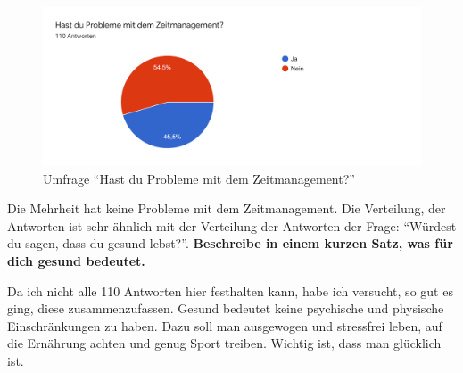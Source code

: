 \begin{figure}[H]
  \centering
  \includegraphics[width=0.7\linewidth]{./images/umfrage_g.png}
  \caption{Umfrage “Hast du Probleme mit dem Zeitmanagement?”}
  \label{fig:umfrage_g}
\end{figure}
Die Mehrheit hat keine Probleme mit dem Zeitmanagement. Die Verteilung, der Antworten ist sehr ähnlich mit der Verteilung der Antworten der Frage: “Würdest du sagen, dass du gesund lebst?”.
\newline
\newline
\textbf{Beschreibe in einem kurzen Satz, was für dich gesund bedeutet.}

Da ich nicht alle 110 Antworten hier festhalten kann, habe ich versucht, so gut es ging, diese zusammenzufassen.
\newline
Gesund bedeutet keine psychische und physische Einschränkungen zu haben. Dazu soll man ausgewogen und stressfrei leben, auf die Ernährung achten und genug Sport treiben. Wichtig ist, dass man glücklich ist.